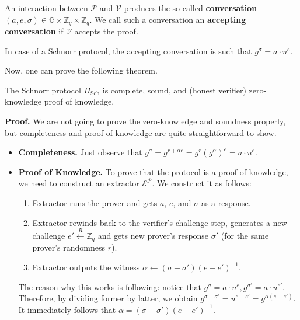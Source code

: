 \documentclass[../lecture-notes.tex]{subfiles}
\begin{document}
\begin{definition}
    An interaction between $\mathcal{P}$ and $\mathcal{V}$ produces the so-called \textbf{conversation} $(a,e,\sigma) \in \mathbb{G} \times \mathbb{Z}_q \times \mathbb{Z}_q$. We call such a conversation an \textbf{accepting conversation} if $\mathcal{V}$ accepts the proof.
\end{definition}

\begin{example}
    In case of a Schnorr protocol, the accepting conversation is such that $g^{\sigma} = a \cdot u^e$.
\end{example}

Now, one can prove the following theorem.
\begin{theorem}
    The Schnorr protocol $\Pi_{\text{Sch}}$ is complete, sound, and (honest verifier) zero-knowledge proof of knowledge.
\end{theorem}

\textbf{Proof.} We are not going to prove the zero-knowledge and soundness properly, but completeness and proof of knowledge are quite straightforward to show.

\begin{itemize}
    \item \textbf{Completeness.} Just observe that $g^{\sigma} = g^{r+\alpha e} = g^r(g^{\alpha})^e = a \cdot u^e$.
    \item \textbf{Proof of Knowledge.} To prove that the protocol is a proof of knowledge, we need to construct an extractor $\mathcal{E}^{\mathcal{P}}$. We construct it as follows:
    \begin{enumerate}
        \item Extractor runs the prover and gets $a$, $e$, and $\sigma$ as a response.
        \item Extractor rewinds back to the verifier's challenge step, generates a new challenge $e' \xleftarrow{R} \mathbb{Z}_q$ and gets new prover's response $\sigma'$ (for the same prover's randomness $r$).
        \item Extractor outputs the witness $\alpha \gets (\sigma - \sigma')(e - e')^{-1}$.
    \end{enumerate}
    The reason why this works is following: notice that $g^{\sigma} = a \cdot u^{e}, g^{\sigma'} = a \cdot u^{e'}$. Therefore, by dividing former by latter, we obtain $g^{\sigma - \sigma'} = u^{e - e'} = g^{\alpha(e-e')}$. It immediately follows that $\alpha = (\sigma - \sigma')(e - e')^{-1}$.
\end{itemize}
\end{document}
